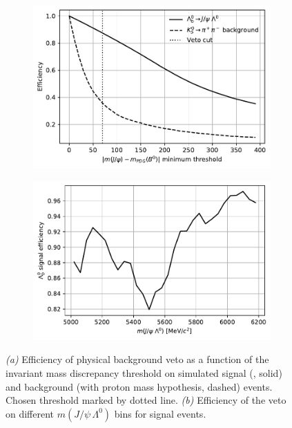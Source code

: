 \begin{figure}[t]
	\centering
	\begin{subfigure}{.45\textwidth}
		\includegraphics[height=.2\textheight]{graphics/04-event_selection/phys_veto_efficiencies.pdf}
		\caption{}
		\label{fig:4:phys_bkg_veto_eff_thres}
	\end{subfigure}
	\begin{subfigure}{.45\textwidth}
		\includegraphics[height=.2\textheight]{graphics/04-event_selection/phys_veto_sig_efficiencies_per_bin.pdf}
		\caption{}
		\label{fig:4:phys_bkg_veto_eff_mass}
	\end{subfigure}
	\caption[Efficiency of the physical background veto as a function of the invariant mass discrepancy threshold and of $J/\psi\,\Lambda^0$ invariant mass bins.]{\textit{(a)} Efficiency of physical background veto as a function of the invariant mass discrepancy threshold on simulated signal (\demonstratorshort, solid) and background (\physbkgshort with proton mass hypothesis, dashed) events. Chosen threshold marked by dotted line. \textit{(b)} Efficiency of the veto on different $m(J/\psi\,\Lambda^0)$ bins for \demonstratorshort signal events.}
	\label{fig:4:phys_bkg_veto_eff}
\end{figure}

